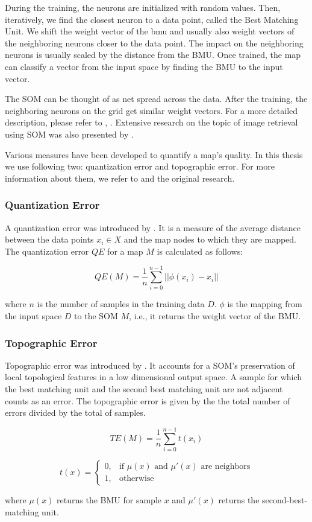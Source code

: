 During the training, the neurons are initialized with random values. Then, iteratively, we find the closest neuron to a data point, called the Best Matching Unit. We shift the weight vector of the \acrshort{bmu} and usually also weight vectors of the neighboring neurons closer to the data point. The impact on the neighboring neurons is usually scaled by the distance from the BMU. Once trained, the map can classify a vector from the input space by finding the BMU to the input vector.

The SOM can be thought of as net spread across the data. After the training, the neighboring neurons on the grid get similar weight vectors. For a more detailed description, please refer to \cite{kohonen1982self}, \cite{kohonen2007kohonen}. Extensive research on the topic of image retrieval using SOM was also presented by \cite{koskela2003interactive}.

Various measures have been developed to quantify a map's quality. In this thesis we use following two: quantization error and topographic error. For more information about them, we refer to \cite{breard2017evaluating} and the original research.

\subsubsection*{Quantization Error}
A quantization error was introduced by \cite{kohonen1982self}. It is a measure of the average distance between the data points $x_i \in X$ and the map nodes to which they are mapped. The quantization error $QE$ for a map $M$ is calculated as follows:

$$
 QE(M) = \frac{1}{n}\sum_{i=0}^{n-1} ||\phi(x_i) - x_i ||
$$

where $n$ is the number of samples in the training data $D$. $\phi$ is the mapping from the input space $D$ to the SOM $M$, i.e., it returns the weight vector of the BMU.

\subsubsection*{Topographic Error}

Topographic error was introduced by \cite{kiviluoto1996topology}. It accounts for a SOM's preservation of local topological features in a low dimensional output space. A sample for which the best matching unit and the second best matching unit are not adjacent counts as an error. The topographic error is given by the the total number of errors divided by the total of samples.

$$
    TE(M) = \frac{1}{n}\sum_{i=0}^{n-1}t(x_i)
$$

$$
    t(x) = \begin{cases}
			0, & \text{if $\mu(x)$ and $\mu'(x)$ are neighbors}\\
            1, & \text{otherwise}
		 \end{cases}
$$

where $\mu(x)$ returns the BMU for sample $x$ and $\mu'(x)$ returns the second-best-matching unit.